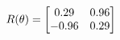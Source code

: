 \documentclass[preview]{standalone}
\begin{document}
\begin{align*}
\special{dvisvgm:raw <g id='unique000'>}R(\theta) = \begin{bmatrix}0.29 & 0.96\\-0.96 & 0.29\end{bmatrix}\special{dvisvgm:raw </g>}
\end{align*}
\end{document}
